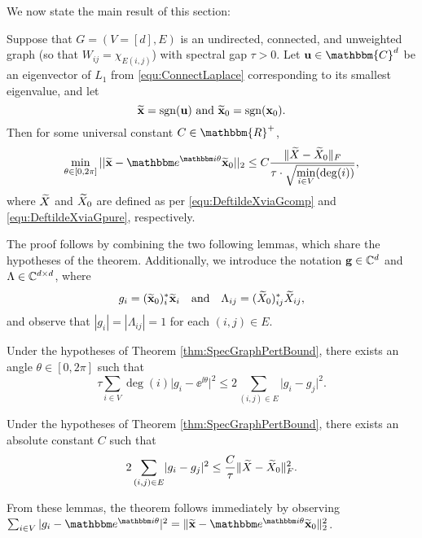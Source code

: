 We now state the main result of this section:

\begin{theorem}
Suppose that $G = (V=[d], E)$ is an undirected, connected, and unweighted graph (so that $W_{ij} = \chi_{E(i, j)}$) with spectral gap $\tau > 0$.  Let ${\bf u} \in \mathbbm{C}^d$ be an eigenvector of $L_1$ from \eqref{equ:ConnectLaplace} corresponding to its smallest eigenvalue, and let \[\widetilde{\bf x} = \sgn({\bf u}) \ \text{and} \ \tx_0 = \sgn(\x_0).\] Then for some universal constant $C \in \mathbbm{R}^+$, \[\min_{\theta \in [0, 2\pi]} ||\tx - \ee^{\ii \theta} \tx_0||_2 \le C \bigfrac{\|\tX - \widetilde{\X}_0\|_F}{\tau \cdot \sqrt{\min_{i \in V}(\deg(i))}},\] where $\widetilde{X}$ and $\widetilde{X}_0$ are defined as per \eqref{equ:DeftildeXviaGcomp} and \eqref{equ:DeftildeXviaGpure}, respectively. %
\label{thm:SpecGraphPertBound}
\end{theorem}

The proof follows by combining the two following lemmas, which share the hypotheses of the theorem.  Additionally, we introduce the notation ${\bf g} \in \mathbb{C}^d$ and $\Lambda \in \mathbb{C}^{d \times d}$, where $$g_i = (\widetilde{\mathbf x}_0)^*_i \widetilde{\mathbf x}_i \quad \text{and} \quad \Lambda_{ij} = (\widetilde{X}_0)^*_{ij} \widetilde{X}_{ij},$$ and observe that $|g_i| = |\Lambda_{ij}| = 1$ for each $(i, j) \in E$.

\begin{lemma}
Under the hypotheses of Theorem \ref{thm:SpecGraphPertBound}, there exists an angle $\theta \in [0, 2\pi]$ such that \[\tau \sum_{i \in V} \deg(i) \lvert g_i - \ee^{\ii \theta} \rvert^2 \le 2 \sum_{(i, j) \in E} \lvert g_i - g_j \rvert^2.\]
\label{lem:gbound1}
\end{lemma}

\begin{lemma}
Under the hypotheses of Theorem \ref{thm:SpecGraphPertBound}, there exists an absolute constant $C$ such that \[2\sum_{(i, j) \in E} \lvert g_i - g_j \rvert^2 \le \dfrac{C}{\tau} \lVert \widetilde{X} - \widetilde{X}_0 \rVert^2_F.\]
\label{lem:gbound2}
\end{lemma}

From these lemmas, the theorem follows immediately by observing $\sum_{i \in V} |g_i - \ee^{\ii \theta}|^2 = \norm{\tx - \ee^{\ii \theta} \tx_0}_2^2$.

